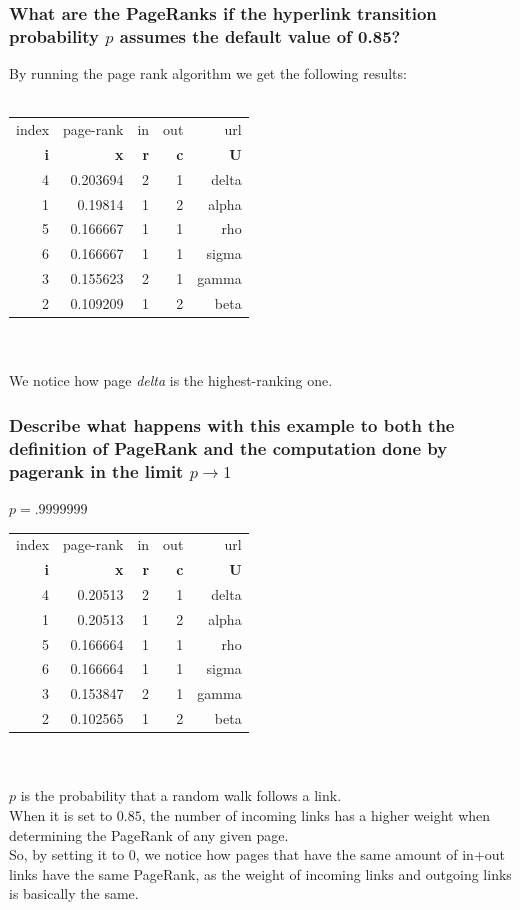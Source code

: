 \documentclass[unicode,11pt,a4paper,oneside,numbers=endperiod,openany]{scrartcl}
\begin{document}
\subsubsection{What are the PageRanks if the hyperlink transition probability $p$ assumes the default value of 0.85?}
By running the page rank algorithm we get the following results:\\\\
\begin{tabular}{|r|r|r|r|r|}
\hline
index & page-rank & in & out & url \\
{\color{teal}\textbf{i}} & \textbf{{\color{teal}x}} & \textbf{{\color{teal}r}} & \textbf{{\color{teal}c}} & \textbf{{\color{teal}U}} \\
\hline
4 &  0.203694 &  2 &   1 & delta \\
1 &   0.19814 &  1 &   2 & alpha \\
5 &  0.166667 &  1 &   1 & rho \\
6 &  0.166667 &  1 &   1 & sigma \\
3 &  0.155623 &  2 &   1 & gamma \\
2 &  0.109209 &  1 &   2 & beta \\
\hline
\end{tabular}\\\\
We notice how page \textit{delta} is the highest-ranking one.
\subsubsection{Describe what happens with this example to both the deﬁnition of PageRank and the computation done by pagerank in the limit $p \rightarrow 1$}
$p = .9999999$\\
\begin{tabular}{|r|r|r|r|r|}
\hline
index & page-rank & in & out & url \\
{\color{teal}\textbf{i}} & \textbf{{\color{teal}x}} & \textbf{{\color{teal}r}} & \textbf{{\color{teal}c}} & \textbf{{\color{teal}U}} \\
\hline
 4  &    0.20513  &   2  &    1  &  delta \\
 1  &    0.20513  &   1  &    2  &  alpha \\
 5  &   0.166664  &   1  &    1  &    rho \\
 6  &   0.166664  &   1  &    1  &  sigma \\
 3  &   0.153847  &   2  &    1  &  gamma \\
 2  &   0.102565  &   1  &    2  &   beta \\
\hline
\end{tabular}\\
\\
$p$ is the probability that a random walk follows a link.\\
When it is set to $0.85$, the number of incoming links has a higher weight when determining the PageRank of any given page.\\
So, by setting it to $0$, we notice how pages that have the same amount of in+out links have the same PageRank, as the weight of incoming links and outgoing links is basically the same.\\
\end{document}
